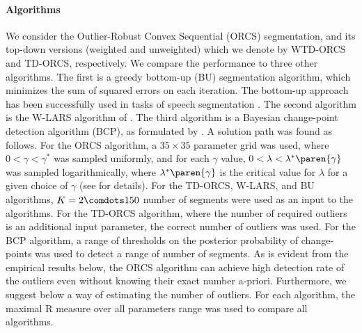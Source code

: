 \paragraph{Algorithms} We consider the Outlier-Robust
Convex Sequential (ORCS) segmentation, and its top-down versions (weighted and unweighted)
which we denote by WTD-ORCS and TD-ORCS, respectively.
We compare the performance to three other algorithms. The first is a greedy bottom-up (BU)
segmentation algorithm, which minimizes the sum of squared errors on
each iteration. The bottom-up approach has been successfully used in
tasks of speech segmentation \cite{qiao:2012study,gracia:2011hierarchical}.
The second algorithm is the W-LARS algorithm of \cite{bleakley2011group}. The third algorithm is a Bayesian change-point detection algorithm (BCP), as formulated by \cite{erdman2008fast}.
A solution path was found as follows.
For the ORCS algorithm, a $35\times35$ parameter grid was used, where
$0<\gamma<\gamma^*$ was sampled uniformly, and for each $\gamma$ value,
$0<\lambda<\lambda^*\paren{\gamma}$ was sampled logarithmically, where
$\lambda^*\paren{\gamma}$ is the critical value for $\lambda$ for a
given choice of $\gamma$ (see  for details). For the TD-ORCS, W-LARS, and BU algorithms,
$K=2\comdots 150$ number of segments were used as an input to the
algorithms. For the TD-ORCS algorithm, where the number of required
outliers is an additional input parameter, the correct number of
outliers was used. For the BCP algorithm, a range of thresholds on the posterior probability of change-points was used to detect a range of number of segments. As is evident from the empirical results below, the ORCS algorithm can
achieve high detection rate of the outliers even without knowing their
exact number a-priori. Furthermore, we suggest below a way of
estimating the number of outliers.
For each algorithm, the maximal R measure over all parameters range
was used to compare all algorithms.

